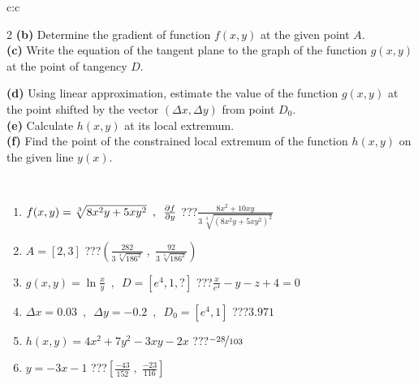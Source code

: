 \documentclass[10pt]{report}
\begin{document}
\begin{tabular}{c:c}
\begin{minipage}[c][104.5mm][t]{0.5\linewidth}
\begin{center}
\begin{minipage}{0.95\linewidth}
\begin{center}
{\begin{multicols}{2}
\textbf{(b)} Determine the gradient of function \(f(x,y)\) at the given point \(A\). \\[1mm]
\textbf{(c)} Write the equation of the tangent plane to the graph of the function \(g(x,y)\) at the point of tangency \(D\). \par \columnbreak
\textbf{(d)} Using linear approximation, estimate the value of the function \(g(x,y)\) at the point shifted by the vector \((\Delta x, \Delta y)\) from point \(D_0\). \\[1mm]
\textbf{(e)} Calculate \(h(x,y)\) at its local extremum. \\[1mm]
\textbf{(f)} Find the point of the constrained local extremum of the function \(h(x,y)\) on the given line \(y(x)\). \\[1mm]
\end{multicols}
}
\end{center}
\end{minipage}
\\[4mm]
\begin{minipage}{0.79\linewidth}
\begin{center}
\begin{varwidth}{\linewidth}
\begin{enumerate}
\normalsizerr
\item $f(x,y) = \sqrt[3]{8x^2y + 5xy^2}\enspace , \enspace \pdv{f}{y}$\quad \dotfill\; ???\;\dotfill \quad $\frac{8x^2+10xy}{3\,\sqrt[3]{(8x^2y+5xy^2)^{2}}}$
\item $A = [2, 3]$\quad \dotfill\; ???\;\dotfill \quad $\left( \frac{282}{3\,\sqrt[3]{186^2}} \;,\; \frac{92}{3\,\sqrt[3]{186^2}} \right)$
\item $g(x,y) = \ln\frac{x}{y} \enspace , \enspace D=[e^{4},1,?]$\quad \dotfill\; ???\;\dotfill \quad $\frac{x}{e^4} - y - z + 4 = 0$
\item $\Delta x = {0.03} \enspace,\enspace \Delta y = {-0.2} \enspace,\enspace D_0 = [e^{4},1]$\quad \dotfill\; ???\;\dotfill \quad $3.971$
\item $h(x,y) = 4x^2+7y^2-3xy-2x$\quad \dotfill\; ???\;\dotfill \quad $\nicefrac{-28}{103}$
\item $y = -3x-1$\quad \dotfill\; ???\;\dotfill \quad $\left[\frac{-43}{152}\;,\;\frac{-23}{116}\right]$
\end{enumerate}
\end{varwidth}
\end{center}
\end{minipage}
\begin{minipage}{0.20\linewidth}
\begin{center}

\end{center}
\end{minipage}
\end{center}
\end{minipage}
\end{tabular}
\end{document}
